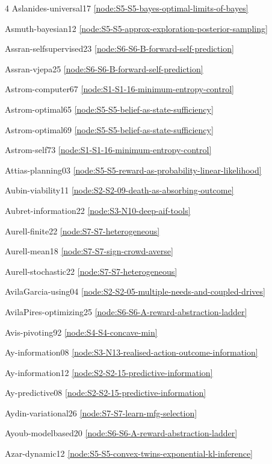 \documentclass[10pt]{article}
\begin{document}
{\begin{multicols}{4}
Aslanides-universal17 \hfill \ref{node:S5-S5-bayes-optimal-limits-of-bayes}\par
Asmuth-bayesian12 \hfill \ref{node:S5-S5-approx-exploration-posterior-sampling}\par
Assran-selfsupervised23 \hfill \ref{node:S6-S6-B-forward-self-prediction}\par
Assran-vjepa25 \hfill \ref{node:S6-S6-B-forward-self-prediction}\par
Astrom-computer67 \hfill \ref{node:S1-S1-16-minimum-entropy-control}\par
Astrom-optimal65 \hfill \ref{node:S5-S5-belief-as-state-sufficiency}\par
Astrom-optimal69 \hfill \ref{node:S5-S5-belief-as-state-sufficiency}\par
Astrom-self73 \hfill \ref{node:S1-S1-16-minimum-entropy-control}\par
Attias-planning03 \hfill \ref{node:S5-S5-reward-as-probability-linear-likelihood}\par
Aubin-viability11 \hfill \ref{node:S2-S2-09-death-as-absorbing-outcome}\par
Aubret-information22 \hfill \ref{node:S3-N10-deep-aif-tools}\par
Aurell-finite22 \hfill \ref{node:S7-S7-heterogeneous}\par
Aurell-mean18 \hfill \ref{node:S7-S7-sign-crowd-averse}\par
Aurell-stochastic22 \hfill \ref{node:S7-S7-heterogeneous}\par
AvilaGarcia-using04 \hfill \ref{node:S2-S2-05-multiple-needs-and-coupled-drives}\par
AvilaPires-optimizing25 \hfill \ref{node:S6-S6-A-reward-abstraction-ladder}\par
Avis-pivoting92 \hfill \ref{node:S4-S4-concave-min}\par
Ay-information08 \hfill \ref{node:S3-N13-realised-action-outcome-information}\par
Ay-information12 \hfill \ref{node:S2-S2-15-predictive-information}\par
Ay-predictive08 \hfill \ref{node:S2-S2-15-predictive-information}\par
Aydin-variational26 \hfill \ref{node:S7-S7-learn-mfg-selection}\par
Ayoub-modelbased20 \hfill \ref{node:S6-S6-A-reward-abstraction-ladder}\par
Azar-dynamic12 \hfill \ref{node:S5-S5-convex-twins-exponential-kl-inference}\par


\end{multicols}}
\end{document}
